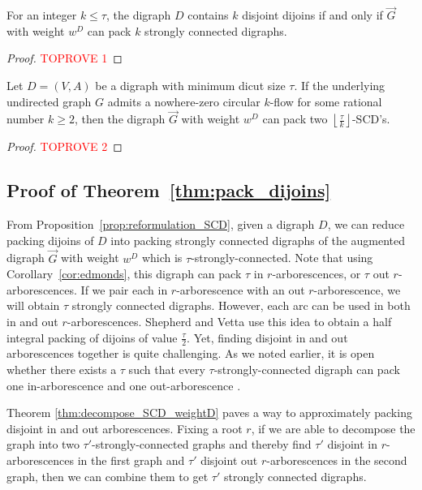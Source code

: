 \documentclass[runningheads]{llncs}
\newcommand{\rounddown}[1]{\left\lfloor#1\right\rfloor}
\begin{document}
\begin{proposition}\label{prop:reformulation_SCD}
     For an integer $k\leq \tau$, the digraph $D$ contains $k$ disjoint dijoins if and only if $\vec{G}$ with weight $w^D$ can pack $k$ strongly connected digraphs.
\end{proposition}
\begin{proof}\textcolor{red}{TOPROVE 1}\end{proof}




\begin{theorem}\label{thm:decompose_SCD_weightD}
     Let $D=(V,A)$ be a digraph with minimum dicut size $\tau$. If the underlying undirected graph $G$ admits a nowhere-zero circular $k$-flow for some rational number $k\geq 2$, then the digraph $\vec{G}$ with weight $w^D$ can pack two $\rounddown{\frac{\tau}{k}}$-SCD's.
\end{theorem}
\begin{proof}\textcolor{red}{TOPROVE 2}\end{proof}



\subsection*{Proof of Theorem~\ref{thm:pack_dijoins}}
From Proposition~\ref{prop:reformulation_SCD}, given a digraph $D$, we can reduce packing dijoins of $D$ into packing strongly connected digraphs of the augmented digraph $\vec{G}$ with weight $w^D$ which is $\tau$-strongly-connected.
Note that using Corollary~\ref{cor:edmonds}, this digraph can pack $\tau$ in $r$-arborescences, or $\tau$ out $r$-arborescences. If we pair each in $r$-arborescence with an out $r$-arborescence, we will obtain $\tau$ strongly connected digraphs. However, each arc can be used in both in and out $r$-arborescences. Shepherd and Vetta \cite{shepherd2005visualizing} use this idea to obtain a half integral packing of dijoins of value $\frac{\tau}{2}$. Yet, finding disjoint in and out arborescences together is quite challenging. As we noted earlier, it is open whether there exists a $\tau$ such that every $\tau$-strongly-connected digraph can pack one in-arborescence and one out-arborescence \cite{bang2009disjoint}.  

Theorem \ref{thm:decompose_SCD_weightD} paves a way to approximately packing disjoint in and out arborescences. Fixing a root $r$, if we are able to decompose the graph into two $\tau'$-strongly-connected graphs and thereby find $\tau'$ disjoint in $r$-arborescences in the first graph and $\tau'$ disjoint out $r$-arborescences in the second graph, then we can combine them to get $\tau'$ strongly connected digraphs. 
\end{document}
